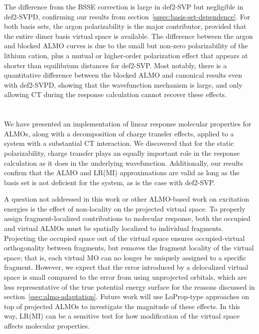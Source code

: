The difference from the BSSE correction is large in def2-SVP but negligible in def2-SVPD, confirming our results from section~\ref{sssec:basis-set-dependence}. For both basis sets, the argon polarizability is the major contributor, provided that the entire dimer basis virtual space is available. The difference between the argon and blocked ALMO curves is due to the small but non-zero polarizability of the lithium cation, plus a mutual or higher-order polarization effect that appears at shorter than equilibrium distances for def2-SVP. Most notably, there is a quantitative difference between the blocked ALMO and canonical results even with def2-SVPD, showing that the wavefunction mechanism is large, and only allowing CT during the response calculation cannot recover these effects.

\section{\texorpdfstring{}{Conclusions and Future Work}}
\label{sec:conclusions-and-future-work}

We have presented an implementation of linear response molecular properties for ALMOs, along with a decomposition of charge transfer effects, applied to a system with a substantial CT interaction. We discovered that for the static polarizability, charge transfer plays an equally important role in the response calculation as it does in the underlying wavefunction. Additionally, our results confirm that the ALMO and LR(MI) approximations are valid as long as the basis set is not deficient for the system, as is the case with def2-SVP.

A question not addressed in this work or other ALMO-based work on excitation energies\cite{Closser_2015_5791,doi:10.1063/1.4926837} is the effect of non-locality on the projected virtual space. To properly assign fragment-localized contributions to molecular response, both the occupied and virtual ALMOs must be spatially localized to individual fragments. Projecting the occupied space out of the virtual space ensures occupied-virtual orthogonality between fragments, but removes the fragment locality of the virtual space; that is, each virtual MO can no longer be uniquely assigned to a specific fragment. However, we expect that the error introduced by a delocalized virtual space is small compared to the error from using unprojected orbitals, which are less representative of the true potential energy surface for the reasons discussed in section~\ref{ssec:almo-adaptation}. Future work will use LoProp-type approaches on top of projected ALMOs to investigate the magnitude of these effects. In this way, LR(MI) can be a sensitive test for how modification of the virtual space affects molecular properties.

